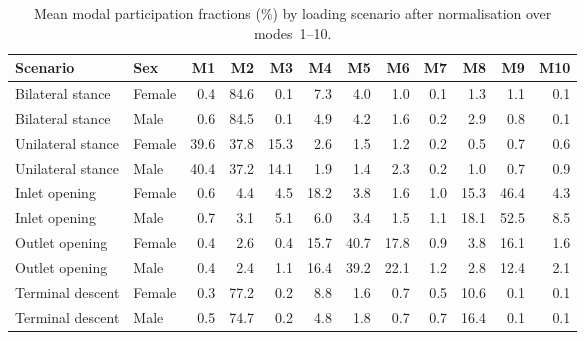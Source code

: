 \documentclass[openacc]{rsproca_new}
\begin{document}
\begin{table}[p]
\centering
\caption{Mean modal participation fractions (\%) by loading scenario after normalisation over modes~1--10.}
\label{tab:loadcases}
\begin{tabular}{llrrrrrrrrrr}
\toprule
Scenario & Sex & M1 & M2 & M3 & M4 & M5 & M6 & M7 & M8 & M9 & M10 \\
\midrule
Bilateral stance & Female & 0.4 & 84.6 & 0.1 & 7.3 & 4.0 & 1.0 & 0.1 & 1.3 & 1.1 & 0.1 \\
Bilateral stance & Male   & 0.6 & 84.5 & 0.1 & 4.9 & 4.2 & 1.6 & 0.2 & 2.9 & 0.8 & 0.1 \\
Unilateral stance & Female & 39.6 & 37.8 & 15.3 & 2.6 & 1.5 & 1.2 & 0.2 & 0.5 & 0.7 & 0.6 \\
Unilateral stance & Male   & 40.4 & 37.2 & 14.1 & 1.9 & 1.4 & 2.3 & 0.2 & 1.0 & 0.7 & 0.9 \\
Inlet opening & Female & 0.6 & 4.4 & 4.5 & 18.2 & 3.8 & 1.6 & 1.0 & 15.3 & 46.4 & 4.3 \\
Inlet opening & Male   & 0.7 & 3.1 & 5.1 & 6.0 & 3.4 & 1.5 & 1.1 & 18.1 & 52.5 & 8.5 \\
Outlet opening & Female & 0.4 & 2.6 & 0.4 & 15.7 & 40.7 & 17.8 & 0.9 & 3.8 & 16.1 & 1.6 \\
Outlet opening & Male   & 0.4 & 2.4 & 1.1 & 16.4 & 39.2 & 22.1 & 1.2 & 2.8 & 12.4 & 2.1 \\
Terminal descent & Female & 0.3 & 77.2 & 0.2 & 8.8 & 1.6 & 0.7 & 0.5 & 10.6 & 0.1 & 0.1 \\
Terminal descent & Male   & 0.5 & 74.7 & 0.2 & 4.8 & 1.8 & 0.7 & 0.7 & 16.4 & 0.1 & 0.1 \\
\bottomrule
\end{tabular}
\end{table}
\end{document}
